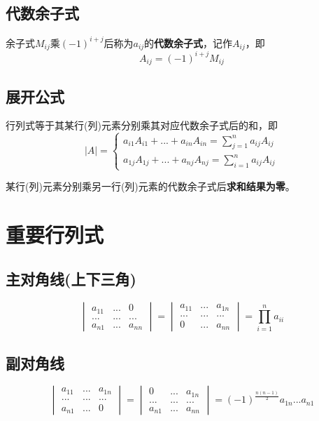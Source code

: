 \subsection{代数余子式}

余子式\(M_{ij}\)乘\((-1)^{i + j}\)后称为\(a_{ij}\)的\textbf{代数余子式}，记作\(A_{ij}\)，即
\[A_{ij} = (-1)^{i+j}M_{ij}\]


\subsection{展开公式}

行列式等于其某行(列)元素分别乘其对应代数余子式后的和，即
\[|A| = 
\begin{cases}
a_{i1}A_{i1} +...+ a_{in}A_{in} = \displaystyle \sum_{j=1}^{n} a_{ij}A_{ij} \\ 
a_{1j}A_{1j} +...+ a_{nj}A_{nj} = \displaystyle \sum_{i=1}^{n} a_{ij}A_{ij}
\end{cases}\]

某行(列)元素分别乘另一行(列)元素的代数余子式后\textbf{求和结果为零}。


\section{重要行列式}

\subsection{主对角线(上下三角)}

\[\begin{vmatrix}
a_{11} & ... & 0 \\
... & ... & ... \\
a_{n1} & ... & a_{nn}
\end{vmatrix} = 
\begin{vmatrix}
a_{11} & ... & a_{1n} \\
... & ... & ... \\
0 & ... & a_{nn}
\end{vmatrix} = \prod_{i = 1}^{n}a_{ii}\]


\subsection{副对角线}

\[\begin{vmatrix}
a_{11} & ... & a_{1n} \\
... & ... & ... \\
a_{n1} & ... & 0
\end{vmatrix} = 
\begin{vmatrix}
0 & ... & a_{1n} \\
... & ... & ... \\
a_{n1} & ... & a_{nn}
\end{vmatrix} = (-1)^{\frac{n(n - 1)}{2}}a_{1n}...a_{n1}\]



